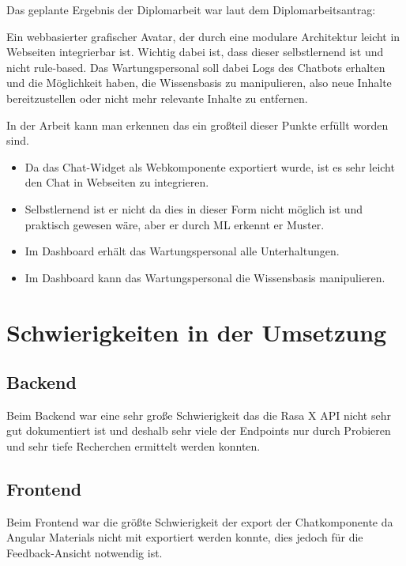 Das geplante Ergebnis der Diplomarbeit war laut dem Diplomarbeitsantrag:

Ein webbasierter grafischer Avatar, der durch eine modulare Architektur leicht in Webseiten integrierbar ist.
Wichtig dabei ist, dass dieser selbstlernend ist und nicht rule-based.
Das Wartungspersonal soll dabei Logs des Chatbots erhalten und die Möglichkeit haben, die Wissensbasis zu manipulieren, also neue Inhalte bereitzustellen oder nicht mehr relevante Inhalte zu entfernen.

In der Arbeit kann man erkennen das ein großteil dieser Punkte erfüllt worden sind.

\begin{itemize}
    \item Da das Chat-Widget als Webkomponente exportiert wurde, ist es sehr leicht den Chat in Webseiten zu integrieren.
    \item Selbstlernend ist er nicht da dies in dieser Form nicht möglich ist und praktisch gewesen wäre, aber er durch ML erkennt er Muster.
    \item Im Dashboard erhält das Wartungspersonal alle Unterhaltungen.
    \item Im Dashboard kann das Wartungspersonal die Wissensbasis manipulieren.
\end{itemize}

\section{Schwierigkeiten in der Umsetzung}


\subsection{Backend}
Beim Backend war eine sehr große Schwierigkeit das die Rasa X API nicht sehr gut dokumentiert ist und deshalb sehr viele der Endpoints nur durch Probieren und sehr tiefe Recherchen ermittelt werden konnten.


\subsection{Frontend}
Beim Frontend war die größte Schwierigkeit der export der Chatkomponente da Angular Materials nicht mit exportiert werden konnte, dies jedoch für die Feedback-Ansicht notwendig ist.
